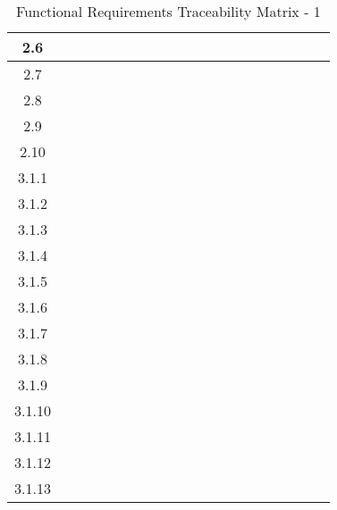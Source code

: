 \documentclass[titlepage]{article}
\begin{document}
\begin{center}
\begin{table}[h!]
\begin{tabular}{|c|c|c|c|c |c|c|c|c|c |c|c|c|c|c |c|c|c|c|c|}
2.6 &&&& &&&&& &&&&& &&&&&\\\hline
2.7 &&&& &&&&& &&&&& &&&&&\\\hline
2.8 &&&& &&&&& &&&&& &&&&&\\\hline
2.9 &&&& &&&&& &&&&& &&&&&\\\hline
2.10 &&&& &&&&& &&&&& &&&&&\\\hline
3.1.1 &&&& &&&&& &&&&& &&&&&\\\hline
3.1.2 &&&& &&&&& &&&&& &&&&&\\\hline
3.1.3 &&&& &&&&& &&&&& &&&&&\\\hline
3.1.4 &&&& &&&&& &&&&& &&&&&\\\hline
3.1.5 &&&& &&&&& &&&&& &&&&&\\\hline
3.1.6 &&&& &&&&& &&&&& &&&&&\\\hline
3.1.7 &&&& &&&&& &&&&& &&&&&\\\hline
3.1.8 &&&& &&&&& &&&&& &&&&&\\\hline
3.1.9 &&&& &&&&& &&&&& &&&&&\\\hline
3.1.10 &&&& &&&&& &&&&& &&&&&\\\hline
3.1.11 &&&& &&&&& &&&&& &&&&&\\\hline
3.1.12 &&&& &&&&& &&&&& &&&&&\\\hline
3.1.13 &&&& &&&&& &&&&& &&&&&\\\hline
\end{tabular}
\caption{Functional Requirements Traceability Matrix - 1}
\end{table}
\end{center}
\end{document}
